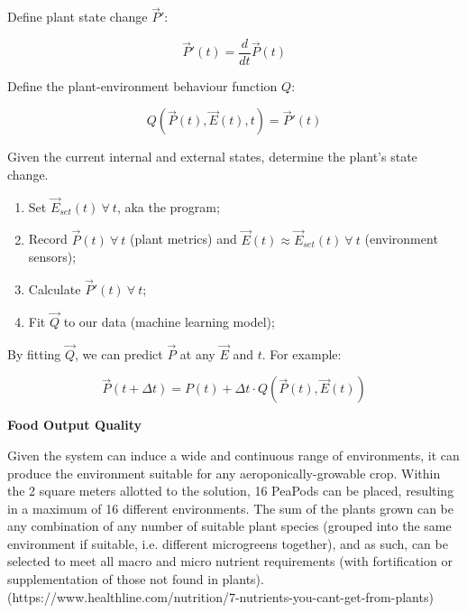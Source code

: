 \documentclass{report}
\begin{document}
Define plant state change $\vec P'$: 

$$\vec P'(t) = \frac{d}{dt}\vec P(t)$$

Define the plant-environment behaviour function $Q$: 

$$Q(\vec P(t), \vec E(t), t)=\vec P'(t)$$ 

Given the current internal and external states, determine the plant's state change.

\begin{enumerate}
    \item Set $\vec E_{set}(t)~\forall~ t$, aka the program;
    \item Record $\vec P(t)~\forall~ t$ (plant metrics) and $\vec E(t)\approx \vec E_{set}(t)~\forall~ t$ (environment sensors);
    \item Calculate $\vec P'(t)~\forall~ t$;
    \item Fit $\vec Q$ to our data (machine learning model);
\end{enumerate}

By fitting $\vec Q$, we can predict $\vec P$ at any $\vec E$ and $t$. For example:

$$\vec P(t+\Delta t)=P(t)+\Delta t\cdot Q(\vec P(t),\vec E(t))$$

\textbf{Food Output Quality}
\label{sec:resource-outputquality}





Given the system can induce a wide and continuous range of environments, it can produce the environment suitable for any aeroponically-growable crop. Within the 2 square meters allotted to the solution, 16 PeaPods can be placed, resulting in a maximum of 16 different environments. The sum of the plants grown can be any combination of any number of suitable plant species (grouped into the same environment if suitable, i.e. different microgreens together), and as such, can be selected to meet all macro and micro nutrient requirements (with fortification or supplementation of those not found in plants). (https://www.healthline.com/nutrition/7-nutrients-you-cant-get-from-plants)
\end{document}
